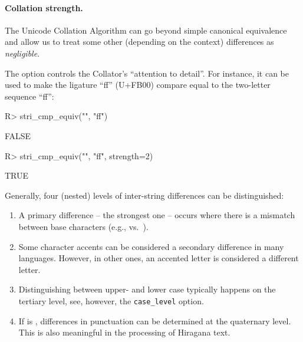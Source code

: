 \documentclass[nojss]{jss}
\begin{document}
\paragraph{Collation strength.}
The Unicode Collation Algorithm \citep{uts10:collation}
can go beyond simple canonical equivalence
and allow us to treat some other (depending on the context)
differences as \textit{negligible}.

The  option controls the Collator's ``attention to detail''.
For instance, it can be used to make the ligature ``ff'' (U+FB00)
compare equal to the two-letter sequence ``f{}f'':

\begin{Schunk}
\begin{Sinput}
R> stri_cmp_equiv("", "ff")
\end{Sinput}
\begin{Soutput}
[1] FALSE
\end{Soutput}
\begin{Sinput}
R> stri_cmp_equiv("", "ff", strength=2)
\end{Sinput}
\begin{Soutput}
[1] TRUE
\end{Soutput}
\end{Schunk}



Generally, four (nested) levels of inter-string differences can be distinguished:
\begin{enumerate}
\item A primary difference -- the strongest one -- occurs where
there is a mismatch between base characters (e.g.,  vs.~).

\item Some character accents can be considered a secondary difference
in many languages. However, in other ones, an accented letter is considered
a different letter.

\item Distinguishing between upper- and lower case typically happens
on the tertiary level, see, however, the \texttt{case\_level} option.


\item If  is ,
differences in punctuation
can be determined at the quaternary level. This is also meaningful
in the processing of Hiragana text.


\end{enumerate}
\end{document}
